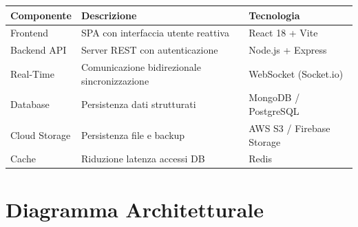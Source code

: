 \documentclass[12pt,a4paper]{report}
\begin{document}
\begin{table}[H]
    \centering
    \begin{tabular}{|l|p{8cm}|l|}
        \hline
        \textbf{Componente} & \textbf{Descrizione} & \textbf{Tecnologia} \\
        \hline
        Frontend & SPA con interfaccia utente reattiva & React 18 + Vite \\
        \hline
        Backend API & Server REST con autenticazione & Node.js + Express \\
        \hline
        Real-Time & Comunicazione bidirezionale sincronizzazione & WebSocket (Socket.io) \\
        \hline
        Database & Persistenza dati strutturati & MongoDB / PostgreSQL \\
        \hline
        Cloud Storage & Persistenza file e backup & AWS S3 / Firebase Storage \\
        \hline
        Cache & Riduzione latenza accessi DB & Redis \\
        \hline
    \end{tabular}
\end{table}

\section{Diagramma Architetturale}
\end{document}
